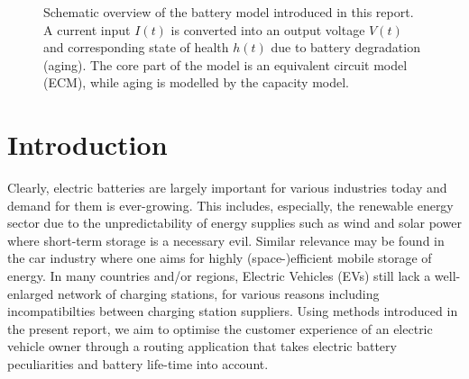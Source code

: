 \documentclass{prettytex/ox/mmsc-special-topic}
\title{\topictitle}
\author{Candidate \candidatenumber}
\date{\today}
\begin{document}
  \pagestyle{plain}
  \mmscSpecialHeader[casestudy]

  \begin{abstract}
    \label{abstract}
    This work will attempt to


    The model was implemented in Python and there is a graphical user interface available with live insight into the model (cf. \autoref{fig:user-interface}).
  \end{abstract}

  \begin{figure}[H]
    \centering
    \caption{Schematic overview of the battery model introduced in this report. A current input $I(t)$ is converted into an output voltage $V(t)$ and corresponding state of health $h(t)$ due to battery degradation (aging). The core part of the model is an equivalent circuit model (ECM), while aging is modelled by the capacity model.}
    \label{fig:model-overview}
  \end{figure}


  \pagebreak
  \pagestyle{normal}

  \section{Introduction}
  Clearly, electric batteries are largely important for various industries today and demand for them is ever-growing.
  This includes, especially, the renewable energy sector due to the unpredictability of energy supplies such as wind and solar power where short-term storage is a necessary evil.
  Similar relevance may be found in the car industry where one aims for highly (space-)efficient mobile storage of energy.
  In many countries and/or regions, Electric Vehicles (EVs) still lack a well-enlarged network of charging stations, for various reasons including incompatibilties between charging station suppliers.
  Using methods introduced in the present report, we aim to optimise the customer experience of an electric vehicle owner through a routing application that takes electric battery peculiarities and battery life-time into account.
\end{document}
